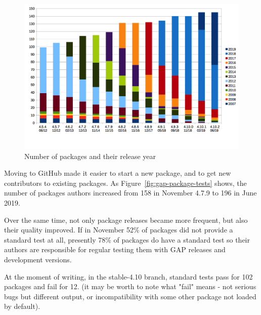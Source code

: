 \documentclass{deliverablereport}
\begin{document}
\begin{figure}[!ht]
    \centering
    \includegraphics[width=\textwidth]{images/gap-package-releases}
    \caption{Number of \GAP packages and their release year}
    \label{fig:gap-package-releases}
\end{figure}

Moving to GitHub made it easier to start a new package, and to 
get new contributors to existing packages. As Figure~\ref{fig:gap-package-tests}
shows, the number of packages authors increased from 158 in
November 4.7.9 to 196 in June 2019. 

Over the same time, not only package releases became more frequent, but also their quality
improved. If in November 52\% of packages did not provide a standard 
test at all, presently 78\% of packages do have a standard test 
so their authors are responsible for regular testing them 
with GAP releases and development versions.

At the moment of writing, in the stable-4.10 branch,
standard tests pass for 102 packages
and fail for 12.
(it may be worth to note what "fail" means - not serious bugs
but different output, or incompatibility with some other package
not loaded by default).
\end{document}
